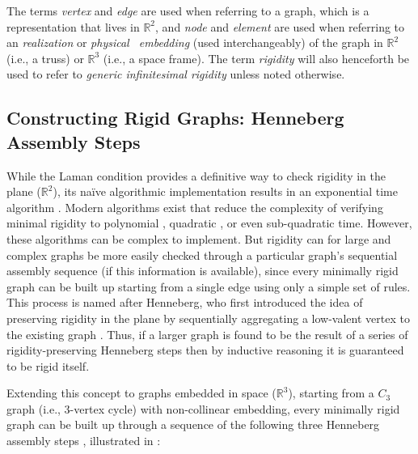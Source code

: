     The terms \textit{vertex} and \textit{edge} are used when referring to a graph, which is a representation that lives in $\mathbb{R}^2$, and \textit{node} and \textit{element} are used when referring to an \textit{realization} or \textit{physical \ embedding} (used interchangeably) of the graph in $\mathbb{R}^2$ (i.e., a truss) or $\mathbb{R}^3$ (i.e., a space frame). The term \textit{rigidity} will also henceforth be used to refer to \textit{generic infinitesimal rigidity} unless noted otherwise.

\subsection{Constructing Rigid Graphs: Henneberg Assembly Steps} \label{sec:3__henneberg}
    While the Laman condition provides a definitive way to check rigidity in the plane ($\mathbb{R}^2$), its naïve algorithmic implementation results in an exponential time algorithm \citep{shai_isomorphic_1999}. Modern algorithms exist that reduce the complexity of verifying minimal rigidity to polynomial \citep{grotschel_ellipsoid_1981,gortler_characterizing_2010}, quadratic \citep{jacobs_algorithm_1997,bereg_certifying_2005}, or even sub-quadratic \citep{daescu_towards_2009} time. However, these algorithms can be complex to implement. But rigidity can for large and complex graphs be more easily checked through a particular graph's sequential assembly sequence (if this information is available), since every minimally rigid graph can be built up starting from a single edge using only a simple set of rules. This process is named after Henneberg, who first introduced the idea of preserving rigidity in the plane by sequentially aggregating a low-valent vertex to the existing graph \citep{henneberg_graphische_1908}. Thus, if a larger graph is found to be the result of a series of rigidity-preserving Henneberg steps then by inductive reasoning it is guaranteed to be rigid itself.
    
    Extending this concept to graphs embedded in space ($\mathbb{R}^3$), starting from a $C_3$ graph (i.e., 3-vertex cycle) with non-collinear embedding, every minimally rigid graph can be built up through a sequence of the following three Henneberg assembly steps \citep{tay_generating_1985}, illustrated in :
    
